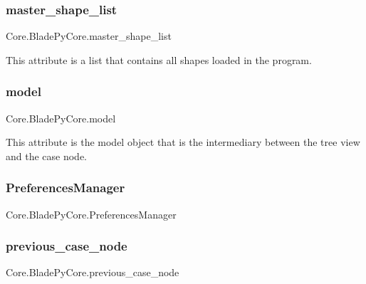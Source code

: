 \subsubsection{\texorpdfstring{master\+\_\+shape\+\_\+list}{master\_shape\_list}}
{\footnotesize\ttfamily Core.\+Blade\+Py\+Core.\+master\+\_\+shape\+\_\+list}



This attribute is a list that contains all shapes loaded in the program. 

\hypertarget{class_core_1_1_blade_py_core_ac74bebda7bd9e99df8e5d26c0b61e0bb}{}\label{class_core_1_1_blade_py_core_ac74bebda7bd9e99df8e5d26c0b61e0bb} 
\subsubsection{\texorpdfstring{model}{model}}
{\footnotesize\ttfamily Core.\+Blade\+Py\+Core.\+model}



This attribute is the model object that is the intermediary between the tree view and the case node. 

\hypertarget{class_core_1_1_blade_py_core_abfb58254f95f980e2821bac01114cd40}{}\label{class_core_1_1_blade_py_core_abfb58254f95f980e2821bac01114cd40} 
\subsubsection{\texorpdfstring{Preferences\+Manager}{PreferencesManager}}
{\footnotesize\ttfamily Core.\+Blade\+Py\+Core.\+Preferences\+Manager}

\hypertarget{class_core_1_1_blade_py_core_a43d75821c1883b1b972c8e0ef9922b4a}{}\label{class_core_1_1_blade_py_core_a43d75821c1883b1b972c8e0ef9922b4a} 
\subsubsection{\texorpdfstring{previous\+\_\+case\+\_\+node}{previous\_case\_node}}
{\footnotesize\ttfamily Core.\+Blade\+Py\+Core.\+previous\+\_\+case\+\_\+node}

